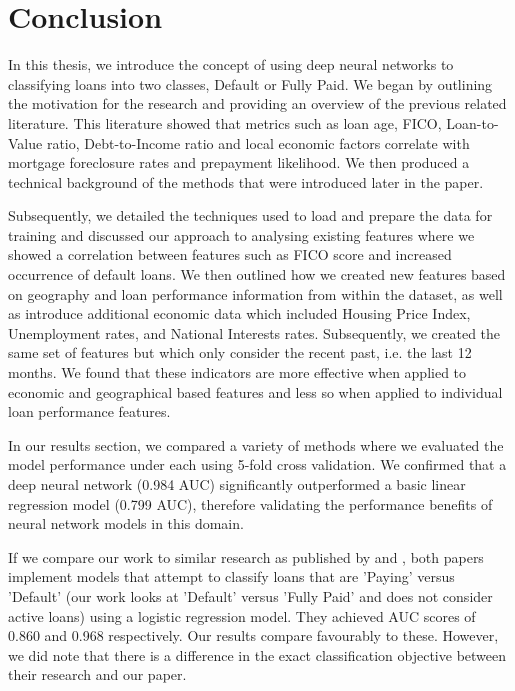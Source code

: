\chapter{Conclusion}

    In this thesis, we introduce the concept of using deep neural networks to classifying loans into two classes, Default or Fully Paid. We began by outlining the motivation for the research and providing an overview of the previous related literature. This literature showed that metrics such as loan age, FICO, Loan-to-Value ratio, Debt-to-Income ratio and local economic factors correlate with mortgage foreclosure rates and prepayment likelihood. We then produced a technical background of the methods that were introduced later in the paper. 
    
    Subsequently, we detailed the techniques used to load and prepare the data for training and discussed our approach to analysing existing features where we showed a correlation between features such as FICO score and increased occurrence of default loans. We then outlined how we created new features based on geography and loan performance information from within the dataset, as well as introduce additional economic data which included Housing Price Index, Unemployment rates, and National Interests rates. Subsequently, we created the same set of features but which only consider the recent past, i.e. the last 12 months. We found that these indicators are more effective when applied to economic and geographical based features and less so when applied to individual loan performance features. 
    
    In our results section, we compared a variety of methods where we evaluated the model performance under each using 5-fold cross validation. We confirmed that a deep neural network (0.984 AUC) significantly outperformed a basic linear regression model (0.799 AUC), therefore validating the performance benefits of neural network models in this domain. 
    
    If we compare our work to similar research as published by \cite{similar_paper_bagherpour} and \cite{similar_paper_deng}, both papers implement models that attempt to classify loans that are 'Paying' versus 'Default' (our work looks at 'Default' versus 'Fully Paid' and does not consider active loans) using a logistic regression model. They achieved AUC scores of 0.860 and 0.968 respectively. Our results compare favourably to these. However, we did note that there is a difference in the exact classification objective between their research and our paper. 
    
